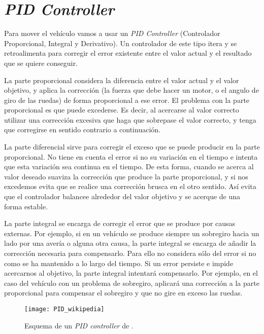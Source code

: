 \section{\textit{PID Controller}}
Para mover el vehículo vamos a usar un \textit{PID Controller} (Controlador Proporcional, Integral y Derivativo). Un controlador de este tipo itera y se retroalimenta para corregir el error existente entre el valor actual y el resultado que se quiere conseguir.

La parte proporcional considera la diferencia entre el valor actual y el valor objetivo, y aplica la corrección (la fuerza que debe hacer un motor, o el angulo de giro de las ruedas) de forma proporcional a ese error. El problema con la parte proporcional es que puede excederse. Es decir, al acercarse al valor correcto utilizar una corrección excesiva que haga que sobrepase el valor correcto, y tenga que corregirse en sentido contrario a continuación.

La parte diferencial sirve para corregir el exceso que se puede producir en la parte proporcional. No tiene en cuenta el error si no su variación en el tiempo e intenta que esta variación sea continua en el tiempo. De esta forma, cuando se acerca al valor deseado suaviza la corrección que produce la parte proporcional, y si nos excedemos evita que se realice una corrección brusca en el otro sentido. Así evita que el controlador balancee alrededor del valor objetivo y se acerque de una forma estable.

La parte integral se encarga de corregir el error que se produce por causas externas. Por ejemplo, si en un vehículo se produce siempre un sobregiro hacia un lado por una avería o alguna otra causa, la parte integral se encarga de añadir la corrección necesaria para compensarlo. Para ello no considera sólo del error si no como se ha mantenido a lo largo del tiempo. Si un error persiste e impide acercarnos al objetivo, la parte integral intentará compensarlo. Por ejemplo, en el caso del vehículo con un problema de sobregiro, aplicará una corrección a la parte proporcional para compensar el sobregiro y que no gire en exceso las ruedas.

\begin{figure}[htpb]
    \centering
    \texttt{[image: PID\_wikipedia]}
    \caption[Esquema de un \textit{PID controller}]{Esquema de un \textit{PID controller} de \cite{wiki:pidimagen}.}
    \label{fig:basics AFM sketch}
\end{figure}

